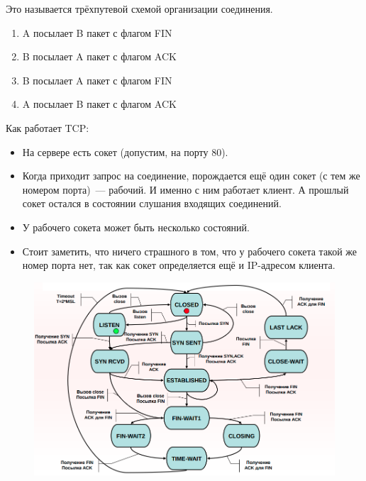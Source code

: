 Это называется трёхпутевой схемой организации соединения.


\begin{enumerate}
    \item A посылает B пакет с флагом FIN
    \item B посылает A пакет с флагом ACK 
    \item B посылает A пакет с флагом FIN
    \item A посылает B пакет с флагом ACK
\end{enumerate}


Как работает TCP:

\begin{itemize}
    \item На сервере есть сокет (допустим, на порту 80).
    \item Когда приходит запрос на соединение, порождается ещё один сокет (с тем же номером порта)~--- рабочий. И именно с ним работает клиент. А прошлый сокет остался в состоянии слушания входящих соединений.
    \item У рабочего сокета может быть несколько состояний.
    \item Стоит заметить, что ничего страшного в том, что у рабочего сокета такой же номер порта нет, так как сокет определяется ещё и IP-адресом клиента.
\end{itemize}

\begin{figure}[H]
  \centering
  \includegraphics[width=15cm]{images/03/06}
\end{figure}

